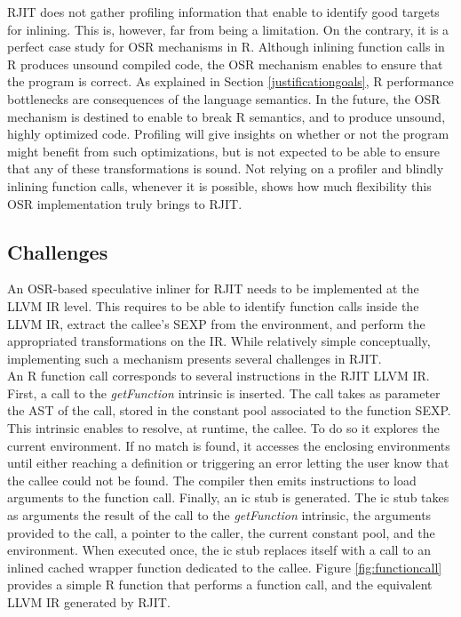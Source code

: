 RJIT does not gather profiling information that enable to identify good targets for inlining.
This is, however, far from being a limitation.
On the contrary, it is a perfect case study for OSR mechanisms in R.
Although inlining function calls in R produces unsound compiled code, the OSR mechanism enables to ensure that the program is correct.
As explained in Section \ref{justificationgoals}, R performance bottlenecks are consequences of the language semantics.
In the future, the OSR mechanism is destined to enable to break R semantics, and to produce unsound, highly optimized code.
Profiling will give insights on whether or not the program might benefit from such optimizations, but is not expected to be able to ensure that any of these transformations is sound.
Not relying on a profiler and blindly inlining function calls, whenever it is possible, shows how much flexibility this OSR implementation truly brings to RJIT.\\ 

\subsection{Challenges}
An OSR-based speculative inliner for RJIT needs to be implemented at the LLVM IR level.
This requires to be able to identify function calls inside the LLVM IR, extract the callee's SEXP from the environment, and perform the appropriated transformations on the IR.
While relatively simple conceptually, implementing such a mechanism presents several challenges in RJIT.\\

An R function call corresponds to several instructions in the RJIT LLVM IR.
First, a call to the \textit{getFunction} intrinsic is inserted.
The call takes as parameter the AST of the call, stored in the constant pool associated to the function SEXP.
This intrinsic enables to resolve, at runtime, the callee. 
To do so it explores the current environment.
If no match is found, it accesses the enclosing environments until either reaching a definition or triggering an error letting the user know that the callee could not be found.
The compiler then emits instructions to load arguments to the function call.
Finally, an ic stub is generated. 
The ic stub takes as arguments the result of the call to the \textit{getFunction} intrinsic, the arguments provided to the call, a pointer to the caller, the current constant pool, and the environment.
When executed once, the ic stub replaces itself with a call to an inlined cached wrapper function dedicated to the callee.
Figure \ref{fig:functioncall} provides a simple R function that performs a function call, and the equivalent LLVM IR generated by RJIT.\\

